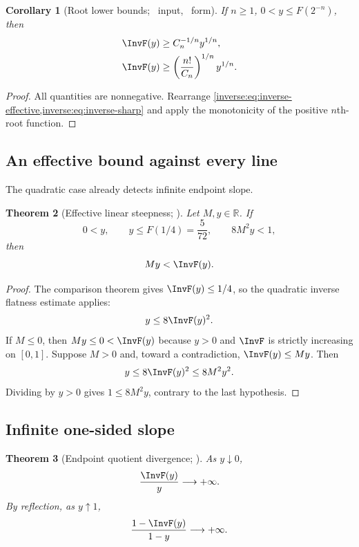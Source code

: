 \documentclass[11pt,oneside]{article}
\newtheorem{theorem}{Theorem}[section]
\newtheorem{corollary}[theorem]{Corollary}
\theoremstyle{definition}
\theoremstyle{remark}
\newcommand{\R}{\mathbb R}
\begin{document}
\begin{corollary}[Root lower bounds; \Formalized\ input, \Derived\ form]
\label{inverse:cor:root-lower}
If $n\geq1$, $0<y\leq F(2^{-n})$, then
\begin{align}
 \InvF(y)&\geq C_n^{-1/n}y^{1/n}, \label{inverse:eq:root-effective}\\
 \InvF(y)&\geq
 \left(\frac{n!}{C_n}\right)^{1/n}y^{1/n}. \label{inverse:eq:root-sharp}
\end{align}
\end{corollary}

\begin{proof}
All quantities are nonnegative.  Rearrange
\cref{inverse:eq:inverse-effective,inverse:eq:inverse-sharp} and apply the monotonicity of
the positive $n$th-root function.
\end{proof}

\subsection{An effective bound against every line}

The quadratic case already detects infinite endpoint slope.

\begin{theorem}[Effective linear steepness; \Formalized]
\label{inverse:thm:effective-linear}
Let $M,y\in\R$.  If
\[
 0<y,\qquad y\leq F(1/4)=\frac5{72},\qquad
 8M^2y<1,
\]
then
\[
 My<\InvF(y).
\]
\end{theorem}

\begin{proof}
The comparison theorem gives $\InvF(y)\leq1/4$, so the quadratic inverse
flatness estimate applies:
\[
 y\leq8\InvF(y)^2. \label{inverse:eq:quadratic-inv}
\]
If $M\leq0$, then $My\leq0<\InvF(y)$ because $y>0$ and $\InvF$ is strictly
increasing on $[0,1]$.  Suppose $M>0$ and, toward a contradiction,
$\InvF(y)\leq My$.  Then
\[
 y\leq8\InvF(y)^2\leq8M^2y^2.
\]
Dividing by $y>0$ gives $1\leq8M^2y$, contrary to the last hypothesis.
\end{proof}

\subsection{Infinite one-sided slope}

\begin{theorem}[Endpoint quotient divergence; \Formalized]
\label{inverse:thm:inverse-quotient}
As $y\downarrow0$,
\[
 \frac{\InvF(y)}{y}\longrightarrow+\infty.
\]
By reflection, as $y\uparrow1$,
\[
 \frac{1-\InvF(y)}{1-y}\longrightarrow+\infty.
\]
\end{theorem}
\end{document}
